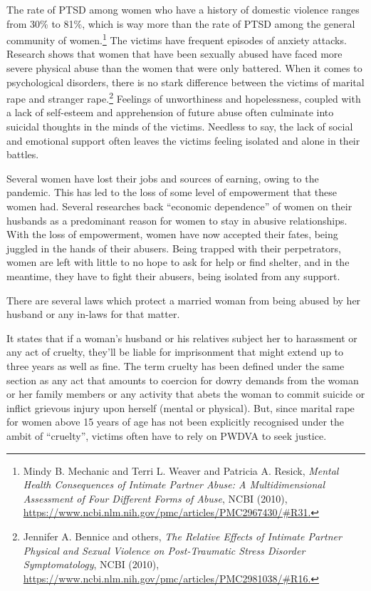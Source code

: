 \begin{multicols}{2}
\noi
The rate of PTSD among women who have a history of domestic violence ranges from 30\%
to 81\%, which is way more than the rate of PTSD among the general community of women.\footnote{Mindy B. Mechanic and Terri L. Weaver and Patricia A. Resick, \textit{Mental Health Consequences of Intimate
Partner Abuse: A Multidimensional Assessment of Four Different Forms of Abuse}, NCBI (2010),
\url{https://www.ncbi.nlm.nih.gov/pmc/articles/PMC2967430/#R31.}}
The victims have frequent episodes of anxiety attacks. Research shows that women that have
been sexually abused have faced more severe physical abuse than the women that were only
battered. When it comes to psychological disorders, there is no stark difference between the
victims of marital rape and stranger rape.\footnote{Jennifer A. Bennice and others, \textit{The Relative Effects of Intimate Partner Physical and Sexual Violence on
Post-Traumatic Stress Disorder Symptomatology}, NCBI (2010),
\url{https://www.ncbi.nlm.nih.gov/pmc/articles/PMC2981038/#R16.}} Feelings of unworthiness and hopelessness,
coupled with a lack of self-esteem and apprehension of future abuse often culminate into
suicidal thoughts in the minds of the victims. Needless to say, the lack of social and
emotional support often leaves the victims feeling isolated and alone in their battles. 

\noi
Several women have lost their jobs and sources of earning, owing to the pandemic. This has
led to the loss of some level of empowerment that these women had. Several researches back
“economic dependence” of women on their husbands as a predominant reason for women to
stay in abusive relationships. With the loss of empowerment, women have now accepted their
fates, being juggled in the hands of their abusers. Being trapped with their perpetrators,
women are left with little to no hope to ask for help or find shelter, and in the meantime, they
have to fight their abusers, being isolated from any support. 


\noi
There are several laws which protect a married woman from being abused by her husband or
any in-laws for that matter.


\noi
It states that if a woman’s husband or his relatives subject her to harassment or any act of
cruelty, they’ll be liable for imprisonment that might extend up to three years as well as fine.
The term cruelty has been defined under the same section as any act that amounts to coercion
for dowry demands from the woman or her family members or any activity that abets the
woman to commit suicide or inflict grievous injury upon herself (mental or physical). But,
since marital rape for women above 15 years of age has not been explicitly recognised under
the ambit of “cruelty”, victims often have to rely on PWDVA to seek justice.


\end{multicols}
